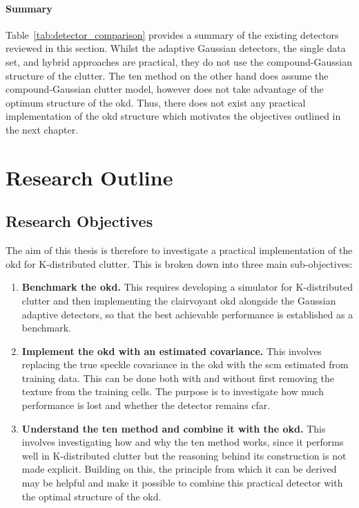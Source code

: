 \documentclass[12pt, a4paper]{report}
\begin{document}
\subsubsection{Summary}
Table~\ref{tab:detector_comparison} provides a summary of the existing detectors reviewed in this section. Whilst the adaptive Gaussian detectors, the single data set, and hybrid approaches are practical, they do not use the compound-Gaussian structure of the clutter. The \gls{ten} method on the other hand does assume the compound-Gaussian clutter model, however does not take advantage of the optimum structure of the \gls{okd}. Thus, there does not exist any practical implementation of the \gls{okd} structure which motivates the objectives outlined in the next chapter.

\newpage
\chapter{Research Outline}
\label{ch:research_outline}

\section{Research Objectives}
\label{sec:objectives}
The aim of this thesis is therefore to investigate a practical implementation of the \acrfull{okd} for K-distributed clutter. This is broken down into three main sub-objectives:
\begin{enumerate}
    \item \textbf{Benchmark the \gls{okd}.} This requires developing a simulator for K-distributed clutter and then implementing the clairvoyant \gls{okd} alongside the Gaussian adaptive detectors, so that the best achievable performance is established as a benchmark.
    \item \textbf{Implement the \gls{okd} with an estimated covariance.} This involves replacing the true speckle covariance in the \gls{okd} with the \gls{scm} estimated from training data. This can be done both with and without first removing the texture from the training cells. The purpose is to investigate how much performance is lost and whether the detector remains \gls{cfar}.
    \item \textbf{Understand the \gls{ten} method and combine it with the \gls{okd}.} This involves investigating how and why the \gls{ten} method \cite{Aboutanios2020} works, since it performs well in K-distributed clutter but the reasoning behind its construction is not made explicit. Building on this, the principle from which it can be derived may be helpful and make it possible to combine this practical detector with the optimal structure of the \gls{okd}.
\end{enumerate}
\end{document}
